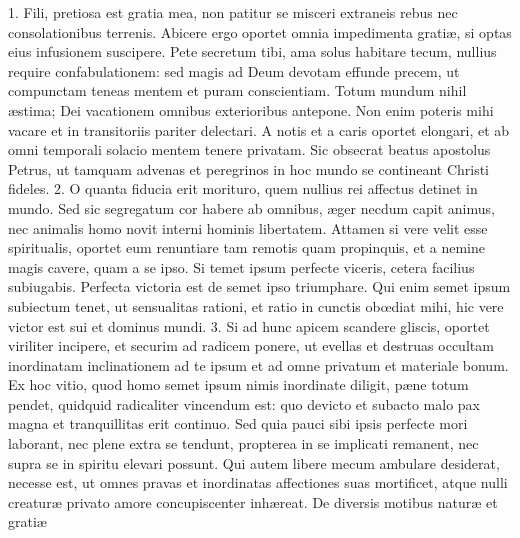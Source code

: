 \documentclass[twoside]{article}
\begin{document}
1. Fili, pretiosa est gratia mea, non patitur se misceri extraneis rebus nec consolationibus terrenis. Abicere ergo oportet omnia impedimenta gratiæ, si optas eius infusionem suscipere. Pete secretum tibi, ama solus habitare tecum, nullius require confabulationem: sed magis ad Deum devotam effunde precem, ut compunctam teneas mentem et puram conscientiam. Totum mundum nihil æstima; Dei vacationem omnibus exterioribus antepone. Non enim poteris mihi vacare et in transitoriis pariter delectari. A notis et a caris oportet elongari, et ab omni temporali solacio mentem tenere privatam. Sic obsecrat beatus apostolus Petrus, ut tamquam advenas et peregrinos in hoc mundo se contineant Christi fideles.
2. O quanta fiducia erit morituro, quem nullius rei affectus detinet in mundo. Sed sic segregatum cor habere ab omnibus, æger necdum capit animus, nec animalis homo novit interni hominis libertatem. Attamen si vere velit esse spiritualis, oportet eum renuntiare tam remotis quam propinquis, et a nemine magis cavere, quam a se ipso. Si temet ipsum perfecte viceris, cetera facilius subiugabis. Perfecta victoria est de semet ipso triumphare. Qui enim semet ipsum subiectum tenet, ut sensualitas rationi, et ratio in cunctis obœdiat mihi, hic vere victor est sui et dominus mundi.
3. Si ad hunc apicem scandere gliscis, oportet viriliter incipere, et securim ad radicem ponere, ut evellas et destruas occultam inordinatam inclinationem ad te ipsum et ad omne privatum et materiale bonum. Ex hoc vitio, quod homo semet ipsum nimis inordinate diligit, pæne totum pendet, quidquid radicaliter vincendum est: quo devicto et subacto malo pax magna et tranquillitas erit continuo. Sed quia pauci sibi ipsis perfecte mori laborant, nec plene extra se tendunt, propterea in se implicati remanent, nec supra se in spiritu elevari possunt. Qui autem libere mecum ambulare desiderat, necesse est, ut omnes pravas et inordinatas affectiones suas mortificet, atque nulli creaturæ privato amore concupiscenter inhæreat.
De diversis motibus naturæ et gratiæ
\end{document}
